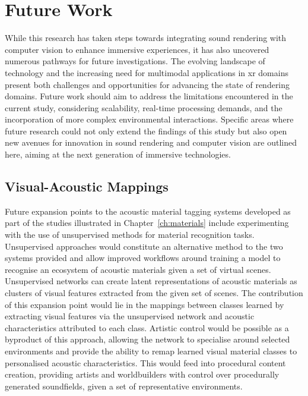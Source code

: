 \section{Future Work}
While this research has taken steps towards integrating sound rendering with computer vision to enhance immersive experiences, it has also uncovered numerous pathways for future investigations. The evolving landscape of technology and the increasing need for multimodal applications in \acrshort{xr} domains present both challenges and opportunities for advancing the state of rendering domains. Future work should aim to address the limitations encountered in the current study, considering scalability, real-time processing demands, and the incorporation of more complex environmental interactions. Specific areas where future research could not only extend the findings of this study but also open new avenues for innovation in sound rendering and computer vision are outlined here, aiming at the next generation of immersive technologies.

\subsection{Visual-Acoustic Mappings}
Future expansion points to the acoustic material tagging systems developed as part of the studies illustrated in Chapter~\ref{ch:materials} include experimenting with the use of unsupervised methods for material recognition tasks. Unsupervised approaches would constitute an alternative method to the two systems provided and allow improved workflows around training a model to recognise an ecosystem of acoustic materials given a set of virtual scenes. Unsupervised networks can create latent representations of acoustic materials as clusters of visual features extracted from the given set of scenes. The contribution of this expansion point would lie in the mappings between classes learned by extracting visual features via the unsupervised network and acoustic characteristics attributed to each class. Artistic control would be possible as a byproduct of this approach, allowing the network to specialise around selected environments and provide the ability to remap learned visual material classes to personalised acoustic characteristics. This would feed into procedural content creation, providing artists and worldbuilders with control over procedurally generated soundfields, given a set of representative environments.


